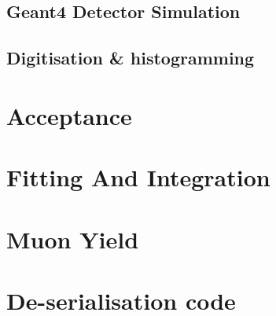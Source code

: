 \documentclass[]{article}
\begin{document}
\subsection{Geant4 Detector Simulation} %
\label{sub:geant4_detector_simulation}

\subsection{Digitisation & histogramming} %
\label{sub:digitisation_histogramming}

\section{Acceptance} %
\label{sec:acceptance}

\section{Fitting And Integration} %
\label{sec:fitting_and_integration}

\section{Muon Yield} %
\label{sec:muon_yield}

\appendix
\section{De-serialisation code} %
\label{app:deserialisation}
\end{document}
